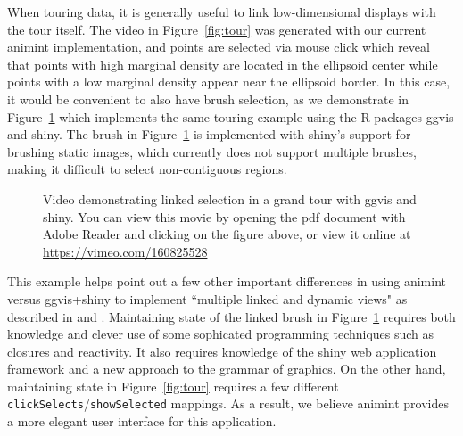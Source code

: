 \documentclass[journal]{vgtc}\usepackage[]{graphicx}\usepackage[]{color}
\begin{document}
When touring data, it is generally useful to link low-dimensional displays with
the tour itself. The video in Figure~\ref{fig:tour} was generated with our
current animint implementation, and points are selected via mouse click which
reveal that points with high marginal density are located in the
ellipsoid center while points with a low marginal density appear near the 
ellipsoid border. In this case, it would be convenient to also have brush 
selection, as we demonstrate in
Figure~\ref{fig:tourbrush} which implements the same touring example using the
R packages ggvis and shiny. The brush in Figure~\ref{fig:tourbrush} is 
implemented with shiny's support for brushing static images, which currently 
does not support multiple brushes, making it difficult to select
non-contiguous regions. 

\begin{figure}[htp]
	\centerline{}
	\label{fig:tourbrush}
	\caption{Video demonstrating linked selection in a grand tour with ggvis and shiny. You can view this movie by opening the pdf document with Adobe Reader and clicking on the figure above, or view it online at \url{https://vimeo.com/160825528}}
\end{figure}

This example helps point out a few other important differences in using 
animint versus ggvis+shiny to implement ``multiple linked and dynamic views" 
as described in \citep{Ahlberg:1991} and \citep{Buja:1991vh}. 
Maintaining state of the linked brush in Figure~\ref{fig:tourbrush} 
requires both knowledge and clever use of some sophicated programming 
techniques such as closures and reactivity. 
It also requires knowledge of the shiny web application framework and 
a new approach to the grammar of graphics. 
On the other hand, maintaining state in Figure~\ref{fig:tour} requires
a few different \texttt{clickSelects}/\texttt{showSelected} mappings. As a
result, we believe animint provides a more elegant user interface for 
this application.
\end{document}
